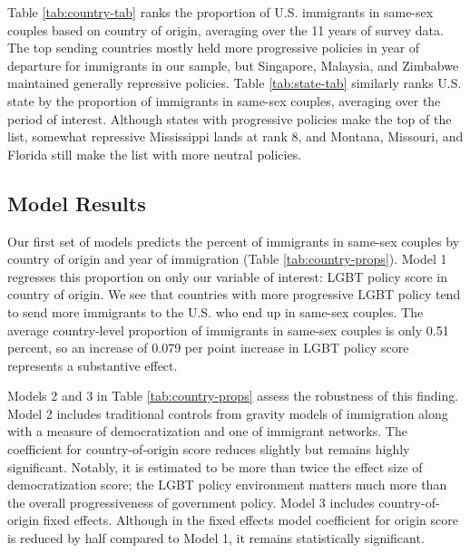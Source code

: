 \documentclass[
  11pt,
]{article}
\begin{document}
Table \ref{tab:country-tab} ranks the proportion of U.S. immigrants in same-sex couples based on country of origin, averaging over the 11 years of survey data. The top sending countries mostly held more progressive policies in year of departure for immigrants in our sample, but Singapore, Malaysia, and Zimbabwe maintained generally repressive policies. Table \ref{tab:state-tab} similarly ranks U.S. state by the proportion of immigrants in same-sex couples, averaging over the period of interest. Although states with progressive policies make the top of the list, somewhat repressive Mississippi lands at rank 8, and Montana, Missouri, and Florida still make the list with more neutral policies.

\hypertarget{model-results}{%
\subsection{Model Results}\label{model-results}}

Our first set of models predicts the percent of immigrants in same-sex couples by country of origin and year of immigration (Table \ref{tab:country-props}). Model 1 regresses this proportion on only our variable of interest: LGBT policy score in country of origin. We see that countries with more progressive LGBT policy tend to send more immigrants to the U.S. who end up in same-sex couples. The average country-level proportion of immigrants in same-sex couples is only 0.51 percent, so an increase of 0.079 per point increase in LGBT policy score represents a substantive effect.

Models 2 and 3 in Table \ref{tab:country-props} assess the robustness of this finding. Model 2 includes traditional controls from gravity models of immigration along with a measure of democratization and one of immigrant networks. The coefficient for country-of-origin score reduces slightly but remains highly significant. Notably, it is estimated to be more than twice the effect size of democratization score; the LGBT policy environment matters much more than the overall progressiveness of government policy. Model 3 includes country-of-origin fixed effects. Although in the fixed effects model coefficient for origin score is reduced by half compared to Model 1, it remains statistically significant.
\end{document}
